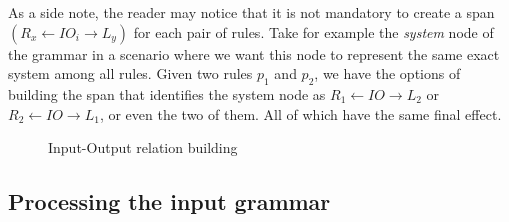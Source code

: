 \begin{example}\label{ex:inout}  

As a side note, the reader may notice that it is not mandatory to create a span \mbox{$\left(R_x \leftarrow IO_i \rightarrow L_y\right)$} for each pair of rules. Take for example the \emph{system} node of the grammar in a scenario where we want this node to represent the same exact system among all rules. Given two rules $p_1$ and $p_2$, we have the options of building the span that identifies the system node as
  $R_1 \leftarrow IO \rightarrow L_2$ or $R_2 \leftarrow IO \rightarrow L_1$, or even the two of them. All of which have the same final effect.

\begin{figure}[!ht]
  \centering
  \caption{Input-Output relation building}\label{fig:tests:inout}
\end{figure}

\end{example}

\subsection{Processing the input grammar}


